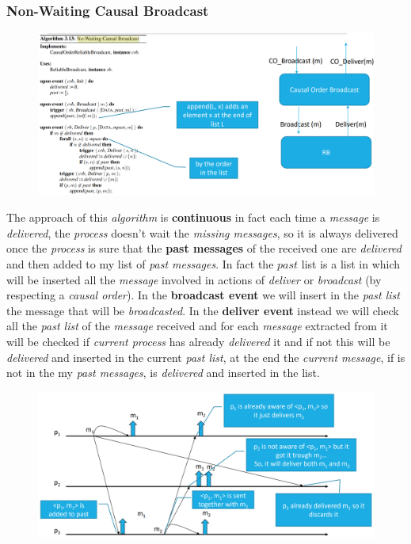 \documentclass{article}
\begin{document}
\subsubsection{Non-Waiting Causal Broadcast}
\begin{figure}[H]
  \centering
  \includegraphics[scale=0.7,left]{cattura54.png}
\end{figure}
The approach of this \emph{algorithm} is \textbf{continuous} in fact each time a \emph{message} is \emph{delivered}, the \emph{process} doesn't wait the \emph{missing messages}, so it is always delivered once the \emph{process} is sure that the \textbf{past messages} of the received one are \emph{delivered} and then added to my list of \emph{past messages}. In fact the $past$ list is a list in which will be inserted all the \emph{message} involved in actions of \emph{deliver} or \emph{broadcast} (by respecting a \emph{causal order}). In the \textbf{broadcast event} we will insert in the\emph{ past list} the message that will be \emph{broadcasted}. In the \textbf{deliver event} instead we will check all the \emph{past list} of the \emph{message} received and for each \emph{message} extracted from it will be checked if \emph{current process} has already \emph{delivered} it and if not this will be \emph{delivered} and inserted in the current \emph{past list}, at the end the \emph{current message}, if is not in the my\emph{ past messages}, is \emph{delivered} and inserted in the list. 
\begin{figure}[H]
  \centering
  \includegraphics[scale=0.45]{cattura55.png}
\end{figure}
\end{document}
